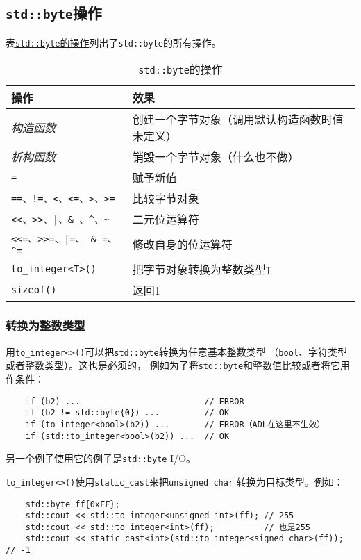 \subsection{\texttt{std::byte}操作}
表\hyperref[t18.1]{\texttt{std::byte}的操作}列出了\texttt{std::byte}的所有操作。
\begin{table}[ht]
    \centering
    \begin{tabular}{l|l}
        \hline
        \textbf{操作} & \textbf{效果} \\
        \hline
        \emph{构造函数} & 创建一个字节对象（调用默认构造函数时值未定义） \\
        \emph{析构函数} & 销毁一个字节对象（什么也不做） \\
        \texttt{=} & 赋予新值 \\
        \texttt{==、!=、<、<=、>、>=} & 比较字节对象 \\
        \texttt{<<、>>、|、\& 、\textasciicircum、\textasciitilde} & 二元位运算符    \\
        \texttt{<<=、>>=、|=、 \& =、\textasciicircum =}              & 修改自身的位运算符 \\
        \texttt{to\_integer<T>()} & 把字节对象转换为整数类型\texttt{T} \\
        \texttt{sizeof()} & 返回1 \\
        \hline
    \end{tabular}
    \caption{\texttt{std::byte}的操作}
    \label{t18.1}
\end{table}

\subsubsection{转换为整数类型}
用\texttt{to\_integer<>()}可以把\texttt{std::byte}转换为任意基本整数类型
（\texttt{bool}、字符类型或者整数类型）。这也是必须的，
例如为了将\texttt{std::byte}和整数值比较或者将它用作条件：
\begin{lstlisting}
    if (b2) ...                         // ERROR
    if (b2 != std::byte{0}) ...         // OK
    if (to_integer<bool>(b2)) ...       // ERROR（ADL在这里不生效）
    if (std::to_integer<bool>(b2)) ...  // OK
\end{lstlisting}
另一个例子使用它的例子是\hyperref[ch18.2.2.2]{\texttt{std::byte} I/O}。

\texttt{to\_integer<>()}使用\texttt{static\_cast}来把\texttt{unsigned char}
转换为目标类型。例如：
\begin{lstlisting}
    std::byte ff{0xFF};
    std::cout << std::to_integer<unsigned int>(ff); // 255
    std::cout << std::to_integer<int>(ff);          // 也是255
    std::cout << static_cast<int>(std::to_integer<signed char>(ff)); // -1
\end{lstlisting}

